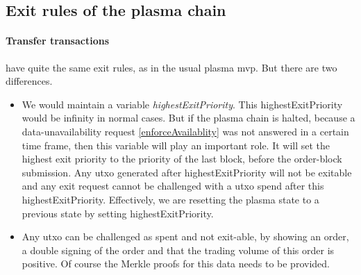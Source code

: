 \documentclass[11pt,parskip=full]{scrartcl}%
\begin{document}
\subsection{Exit rules of the plasma chain}
\label{exitRules}
\paragraph{Transfer transactions} have quite the same exit rules, as in the usual plasma mvp. 
But there are two differences.
\begin{itemize}

 \item We would maintain a variable \emph{highestExitPriority}. 
This highestExitPriority would be infinity in normal cases. 
But if the plasma chain is halted, because a data-unavailability request \ref{enforceAvailablity} was not answered in a certain time frame, then this variable will play an important role. 
It will set the highest exit priority to the priority of the last block, before the order-block submission. 
Any utxo generated after highestExitPriority will not be exitable and any exit request cannot be challenged with a utxo spend after this highestExitPriority. 
Effectively, we are resetting the plasma state to a previous state by setting highestExitPriority. 
\item Any utxo can be challenged as spent and not exit-able, by showing an order, a double signing of the order and that the trading volume of this order is positive. Of course the Merkle proofs for this data needs to be provided.

\end{itemize}
\end{document}
